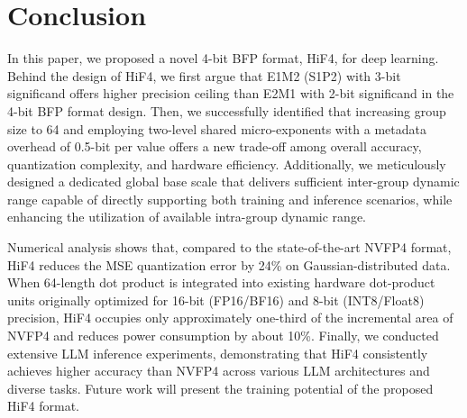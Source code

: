 \section{Conclusion}

In this paper, we proposed a novel 4-bit BFP format, HiF4, for deep 
learning. 
Behind the design of HiF4, we first argue that E1M2 (S1P2) with 3-bit 
significand offers higher precision ceiling than E2M1 with 2-bit 
significand in the 4-bit BFP format design. 
Then, we successfully identified that increasing group size 
to 64 and employing two-level shared micro-exponents with a metadata 
overhead of 0.5-bit per value offers a new trade-off among 
overall accuracy, quantization complexity, and hardware efficiency. 
Additionally, we meticulously designed a dedicated global base scale 
that delivers sufficient inter-group dynamic range capable of directly 
supporting both training and inference scenarios, 
while enhancing the utilization of available intra-group dynamic range. 

Numerical analysis shows that, compared to the state-of-the-art 
NVFP4 format, HiF4 reduces the MSE quantization error by 24\% on  
Gaussian-distributed data. 
When 64-length dot product is integrated into existing hardware 
dot-product units originally optimized for 16-bit (FP16/BF16) 
and 8-bit (INT8/Float8) precision, 
HiF4 occupies only approximately one-third of the incremental 
area of NVFP4 and reduces power consumption by about 10\%. 
Finally, we conducted extensive LLM inference experiments, 
demonstrating that HiF4 consistently achieves higher accuracy 
than NVFP4 across various LLM architectures and diverse tasks. 
Future work will present the training potential of the proposed 
HiF4 format.



